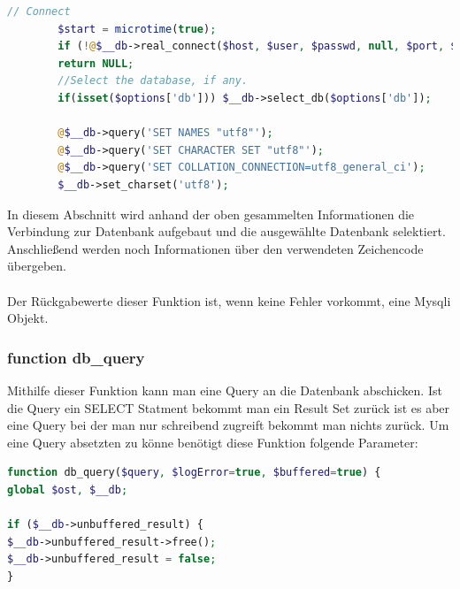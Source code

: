 \begin{lstlisting}[language=PHP, caption=mysqli.php/function-db\_connect4, firstnumber=63]
	    // Connect
	    $start = microtime(true);
	    if (!@$__db->real_connect($host, $user, $passwd, null, $port, $socket))
	    return NULL;
	    //Select the database, if any.
	    if(isset($options['db'])) $__db->select_db($options['db']);
	    
	    @$__db->query('SET NAMES "utf8"');
	    @$__db->query('SET CHARACTER SET "utf8"');
	    @$__db->query('SET COLLATION_CONNECTION=utf8_general_ci');
	    $__db->set_charset('utf8');
\end{lstlisting}
In diesem Abschnitt wird anhand der oben gesammelten Informationen die Verbindung zur Datenbank aufgebaut und die ausgewählte Datenbank selektiert.\\
Anschließend werden noch Informationen über den verwendeten Zeichencode übergeben.\\
\\
Der Rückgabewerte dieser Funktion ist, wenn keine Fehler vorkommt, eine Mysqli Objekt. 
\newpage

\subsubsection{function db\_query}

Mithilfe dieser Funktion kann man eine Query an die Datenbank abschicken. Ist die Query ein SELECT Statment bekommt man ein Result Set zurück ist es aber eine Query bei der man nur schreibend zugreift bekommt man nichts zurück. Um eine Query absetzten zu könne benötigt diese Funktion folgende Parameter:

\begin{lstlisting}[language=PHP, caption=mysqli.php/function-db\_query1, firstnumber=154]
function db_query($query, $logError=true, $buffered=true) {
global $ost, $__db;

if ($__db->unbuffered_result) {
$__db->unbuffered_result->free();
$__db->unbuffered_result = false;
}
\end{lstlisting}

\newpage

